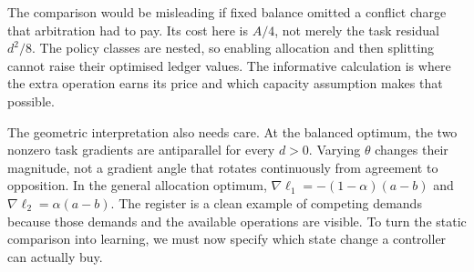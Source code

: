 The comparison would be misleading if fixed balance omitted a conflict charge that arbitration had to pay. Its cost here is \(A/4\), not merely the task residual \(d^2/8\). The policy classes are nested, so enabling allocation and then splitting cannot raise their optimised ledger values. The informative calculation is where the extra operation earns its price and which capacity assumption makes that possible.

The geometric interpretation also needs care. At the balanced optimum, the two nonzero task gradients are antiparallel for every \(d>0\). Varying \(\theta\) changes their magnitude, not a gradient angle that rotates continuously from agreement to opposition. In the general allocation optimum,
\(\nabla\ell_1=-(1-\alpha)(a-b)\) and
\(\nabla\ell_2=\alpha(a-b)\).
The register is a clean example of competing demands because those demands and the available operations are visible. To turn the static comparison into learning, we must now specify which state change a controller can actually buy.
